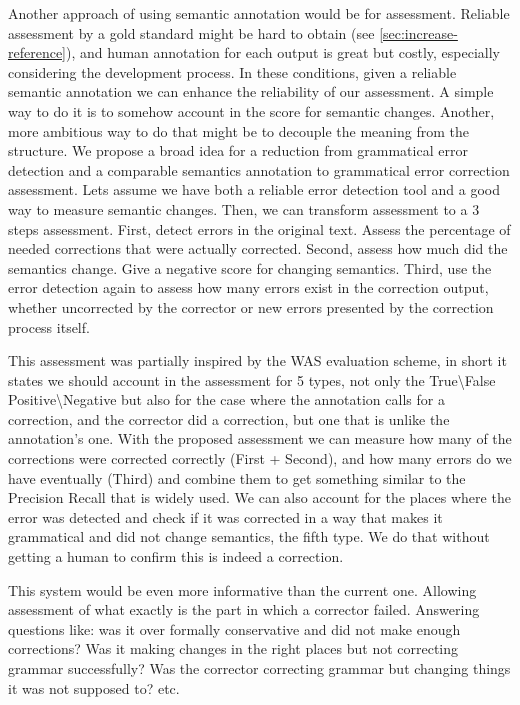 \documentclass[english]{article}
\begin{document}
Another approach of using semantic annotation would be for assessment.
Reliable assessment by a gold standard might be hard to obtain (see
\ref{sec:increase-reference}), and human annotation for each output
is great \cite{madnani2011they} but costly, especially considering the
development process. In these conditions,
given a reliable semantic annotation we can enhance the reliability
of our assessment. A simple way to do it is to somehow account in the
score for semantic changes. Another, more ambitious way to do that might be to decouple the meaning
from the structure. We propose a broad idea for a reduction from grammatical
error detection and a comparable semantics annotation to grammatical
error correction assessment. Lets assume we have both a reliable error
detection tool and a good way to measure semantic changes. Then, we
can transform assessment to a 3 steps assessment. First, detect errors
in the original text. Assess the percentage of needed corrections
that were actually corrected. Second, assess how much did the semantics change.
 Give a negative score for changing semantics. Third, use
the error detection again to assess how many errors exist in the correction
output, whether uncorrected by the corrector or new errors presented
by the correction process itself. 

This assessment was partially inspired by the WAS evaluation scheme\cite{chodorow2012problems},
in short it states we should account in the assessment for 5 types,
not only the True\textbackslash{}False Positive\textbackslash{}Negative
but also for the case where the annotation calls for a correction,
and the corrector did a correction, but one that is unlike the annotation's
one. With the proposed assessment we can measure how many of the corrections
were corrected correctly (First + Second), and how many errors do
we have eventually (Third) and combine them to get something similar
to the Precision Recall that is widely used. We can also account for
the places where the error was detected and check if it was corrected
in a way that makes it grammatical and did not change semantics, the
fifth type. We do that without getting a human to confirm this is
indeed a correction.

This system would be even more informative than the current one. Allowing assessment of
what exactly is the part in which a corrector failed. Answering questions
like: was it over formally conservative and did not make enough corrections?
Was it making changes in the right places but not correcting grammar
successfully? Was the corrector correcting grammar but changing things
it was not supposed to? etc.
\end{document}
